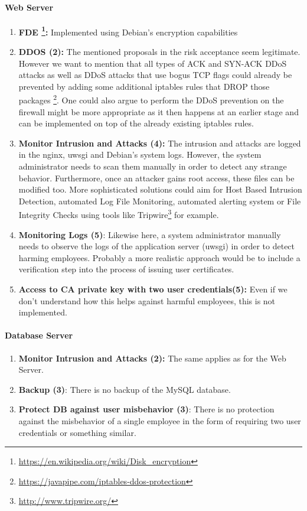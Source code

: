 \documentclass[english]{article}
\begin{document}
\paragraph{Web Server}
\begin{enumerate}[label=(\alph*)] 
\item \textbf{FDE \footnote{\url{https://en.wikipedia.org/wiki/Disk_encryption}}:} Implemented using Debian's encryption capabilities 
\item \textbf{DDOS (2):} The mentioned proposals in the risk acceptance seem legitimate. However we want to mention that all types of ACK and SYN-ACK DDoS attacks as well as DDoS attacks that use bogus TCP flags could already be prevented by adding some additional iptables rules that DROP those packages \footnote{\url{https://javapipe.com/iptables-ddos-protection}}. One could also argue to perform the DDoS prevention on the firewall might be more appropriate as it then happens at an earlier stage and can be implemented on top of the already existing iptables rules.
\item \textbf{Monitor Intrusion and Attacks (4):} The intrusion and attacks are logged in the nginx, uwsgi and Debian's system logs. However, the system administrator needs to scan them manually in order to detect any strange behavior. Furthermore, once an attacker gains root access, these files can be modified too. More sophisticated solutions could aim for Host Based Intrusion Detection, automated Log File Monitoring, automated alerting system or File Integrity Checks using tools like Tripwire\footnote{\url{http://www.tripwire.org/}} for example.
\item \textbf{Monitoring Logs (5)}: Likewise here, a system administrator manually needs to observe the logs of the application server (uwsgi) in order to detect harming employees. Probably a more realistic approach would be to include a verification step into the process of issuing user certificates.
\item \textbf{Access to CA private key with two user credentials(5):} Even if we don't understand how this helps against harmful employees, this is not implemented.
\end{enumerate} 

\paragraph{Database Server}
\begin{enumerate}[label=(\alph*)]
	\item \textbf{Monitor Intrusion and Attacks (2):} The same applies as for the Web Server.
	\item \textbf{Backup (3)}: There is no backup of the MySQL database.
	\item \textbf{Protect DB against user misbehavior (3)}: There is no protection against the misbehavior of a single employee in the form of requiring two user credentials or something similar.
\end{enumerate} 
\end{document}
